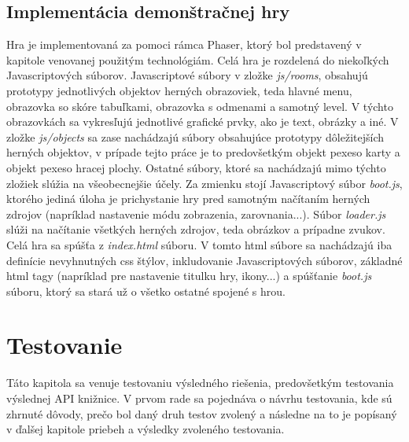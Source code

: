 \section{Implementácia demonštračnej hry}
Hra je implementovaná za pomoci rámca Phaser, ktorý bol predstavený v kapitole venovanej použitým technológiám. Celá hra je rozdelená do niekoľkých Javascriptových súborov. Javascriptové súbory v zložke \textit{js/rooms}, obsahujú prototypy jednotlivých objektov herných obrazoviek, teda hlavné menu, obrazovka so skóre tabuľkami, obrazovka s odmenami a samotný level.  V týchto obrazovkách sa vykresľujú jednotlivé grafické prvky, ako je text, obrázky a iné. V zložke  \textit{js/objects} sa zase nachádzajú súbory obsahujúce prototypy dôležitejších herných objektov, v prípade tejto práce je to predovšetkým objekt pexeso karty a objekt pexeso hracej plochy. Ostatné súbory, ktoré sa nachádzajú mimo týchto zložiek slúžia na všeobecnejšie účely. Za zmienku stojí Javascriptový súbor \textit{boot.js}, ktorého jediná úloha je prichystanie hry pred samotným načítaním herných zdrojov (napríklad nastavenie módu zobrazenia, zarovnania...). Súbor \textit{loader.js} slúži na načítanie všetkých herných zdrojov, teda obrázkov a prípadne zvukov. Celá hra sa spúšťa z \textit{index.html} súboru. V tomto html súbore sa nachádzajú iba definície nevyhnutných css štýlov, inkludovanie Javascriptových súborov, základné html tagy (napríklad pre nastavenie titulku hry, ikony...) a spúšťanie \textit{boot.js} súboru, ktorý sa stará už o všetko ostatné spojené s hrou.

\chapter{Testovanie}
\label{chap:testovanie}
Táto kapitola sa venuje testovaniu výsledného riešenia, predovšetkým testovania výslednej API knižnice. V prvom rade sa pojednáva o návrhu testovania, kde sú zhrnuté dôvody, prečo bol daný druh testov zvolený a následne na to je popísaný v ďalšej kapitole priebeh a výsledky zvoleného testovania.

